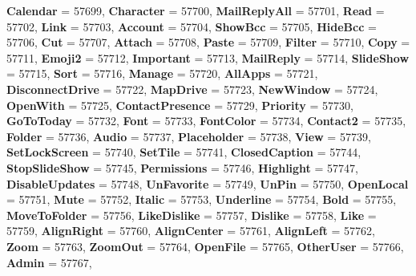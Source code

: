 \begin{DoxyCompactItemize}
{\bfseries Calendar} = 57699, 
{\bfseries Character} = 57700, 
{\bfseries Mail\+Reply\+All} = 57701, 
{\bfseries Read} = 57702, 
\newline
{\bfseries Link} = 57703, 
{\bfseries Account} = 57704, 
{\bfseries Show\+Bcc} = 57705, 
{\bfseries Hide\+Bcc} = 57706, 
\newline
{\bfseries Cut} = 57707, 
{\bfseries Attach} = 57708, 
{\bfseries Paste} = 57709, 
{\bfseries Filter} = 57710, 
\newline
{\bfseries Copy} = 57711, 
{\bfseries Emoji2} = 57712, 
{\bfseries Important} = 57713, 
{\bfseries Mail\+Reply} = 57714, 
\newline
{\bfseries Slide\+Show} = 57715, 
{\bfseries Sort} = 57716, 
{\bfseries Manage} = 57720, 
{\bfseries All\+Apps} = 57721, 
\newline
{\bfseries Disconnect\+Drive} = 57722, 
{\bfseries Map\+Drive} = 57723, 
{\bfseries New\+Window} = 57724, 
{\bfseries Open\+With} = 57725, 
\newline
{\bfseries Contact\+Presence} = 57729, 
{\bfseries Priority} = 57730, 
{\bfseries Go\+To\+Today} = 57732, 
{\bfseries Font} = 57733, 
\newline
{\bfseries Font\+Color} = 57734, 
{\bfseries Contact2} = 57735, 
{\bfseries Folder} = 57736, 
{\bfseries Audio} = 57737, 
\newline
{\bfseries Placeholder} = 57738, 
{\bfseries View} = 57739, 
{\bfseries Set\+Lock\+Screen} = 57740, 
{\bfseries Set\+Tile} = 57741, 
\newline
{\bfseries Closed\+Caption} = 57744, 
{\bfseries Stop\+Slide\+Show} = 57745, 
{\bfseries Permissions} = 57746, 
{\bfseries Highlight} = 57747, 
\newline
{\bfseries Disable\+Updates} = 57748, 
{\bfseries Un\+Favorite} = 57749, 
{\bfseries Un\+Pin} = 57750, 
{\bfseries Open\+Local} = 57751, 
\newline
{\bfseries Mute} = 57752, 
{\bfseries Italic} = 57753, 
{\bfseries Underline} = 57754, 
{\bfseries Bold} = 57755, 
\newline
{\bfseries Move\+To\+Folder} = 57756, 
{\bfseries Like\+Dislike} = 57757, 
{\bfseries Dislike} = 57758, 
{\bfseries Like} = 57759, 
\newline
{\bfseries Align\+Right} = 57760, 
{\bfseries Align\+Center} = 57761, 
{\bfseries Align\+Left} = 57762, 
{\bfseries Zoom} = 57763, 
\newline
{\bfseries Zoom\+Out} = 57764, 
{\bfseries Open\+File} = 57765, 
{\bfseries Other\+User} = 57766, 
{\bfseries Admin} = 57767, 

\end{DoxyCompactItemize}
